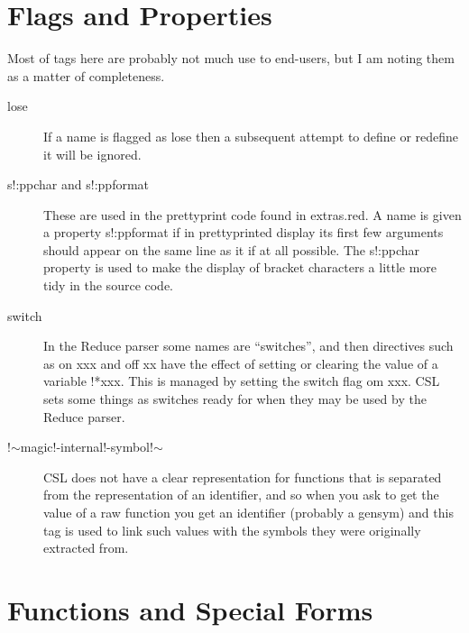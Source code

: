 \documentclass[a4paper,11pt]{article}
\begin{document}
\section{Flags and Properties}
  
Most of tags here are probably not much use to end-users, but I am
noting them as a matter of completeness.
  
\begin{description}

\item [{\ttfamily lose}] 
If a name is flagged as {\ttfamily lose} then a subsequent attempt to
define or redefine it will be ignored.

\item [{\ttfamily s!:ppchar} and {\ttfamily s!:ppformat}] 
These are used in the prettyprint code found in {\ttfamily extras.red}. A
name is given a property {\ttfamily s!:ppformat} if in prettyprinted display
its first few arguments should appear on the same line as it if at all
possible. The {\ttfamily s!:ppchar} property is used to make the display of
bracket characters a little more tidy in the source code.

\item [{\ttfamily switch}] 
In the Reduce parser some names are ``switches'', and then directives such
as {\ttfamily on xxx} and {\ttfamily off xx} have the effect of setting or
clearing the value of a variable {\ttfamily !*xxx}. This is managed by
setting the {\ttfamily switch} flag om {\ttfamily xxx}. CSL sets some
things as switches ready for when they may be used by the Reduce parser.

\item [{\ttfamily !$\sim$magic!-internal!-symbol!$\sim$}] 
CSL does not have a clear representation for functions that is separated from
the representation of an identifier, and so when you ask to get the value
of a raw function you get an identifier (probably a gensym) and this
tag is used to link such values with the symbols they were originally
extracted from.

\end{description} %

\section{Functions and Special Forms}
  
\end{document}
